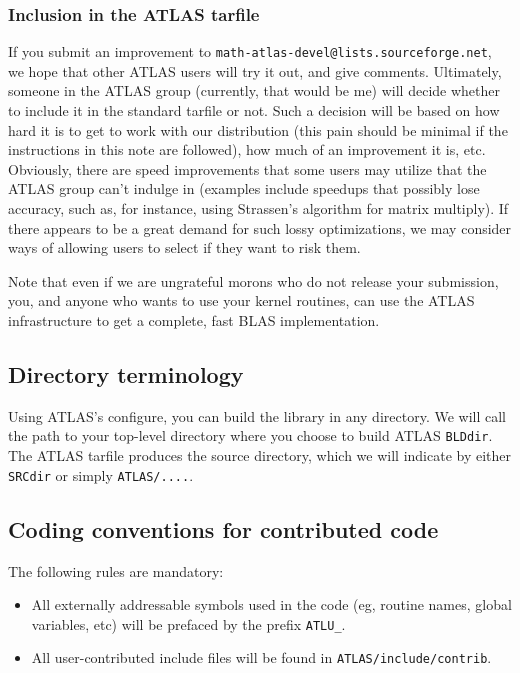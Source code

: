 \documentclass[11pt]{article}
\begin{document}
\subsubsection{Inclusion in the ATLAS tarfile}

If you submit an improvement to {\tt math-atlas-devel@lists.sourceforge.net},
we hope that
other ATLAS users will try it out, and give comments.  Ultimately, 
someone in the ATLAS group (currently, that would be me) will decide 
whether to include it in the standard tarfile or not.  Such a decision
will be based on how hard it is to get to work with our distribution
(this pain should be minimal if the instructions in this note are followed),
how much of an improvement it is, etc.  Obviously, there are speed improvements
that some users may utilize that the ATLAS group can't indulge in (examples
include speedups that possibly lose accuracy, such as, for instance, using
Strassen's algorithm for matrix multiply).  If there appears to be a great
demand for such lossy optimizations, we may consider ways of allowing
users to select if they want to risk them.

Note that even if we are ungrateful morons who do not release your
submission, you, and anyone who wants to use your kernel routines,
can use the ATLAS infrastructure to get a complete, fast BLAS implementation.

\subsection{Directory terminology}
Using ATLAS's configure, you can build the library in any directory.  We
will call the path to your top-level directory where you choose to build
ATLAS {\tt BLDdir}.  The ATLAS tarfile produces the source directory,
which we will indicate by either {\tt SRCdir} or simply {\tt ATLAS/....}.

\subsection{Coding conventions for contributed code}
The following rules are mandatory:
\begin{itemize}
\item All externally addressable symbols used in the code (eg, routine names,
global variables, etc) will be prefaced by the prefix {\tt ATLU\_}.
\item All user-contributed include files will be found in
{\tt ATLAS/include/contrib}.
\end{itemize}
\end{document}
